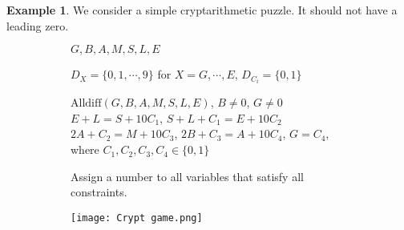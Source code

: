 \documentclass{article}
\theoremstyle{definition}
\newtheorem{example}{Example}[definition]
\begin{document}
\begin{example}
	\label{Cryptarithmetic puzzle}
	We consider a simple cryptarithmetic puzzle. It should not have a leading zero.
	\begin{figure}[h]
		\begin{subfigure}[h]{0.69\textwidth}
			\begin{description}[style=nextline]
				\item[Variables:] $G,B,A,M,S,L,E$
				\item[Domain:] $D_{X}=\{0,1,\cdots,9\}$ for $X=G,\cdots,E$, $D_{C_{i}}=\{0,1\}$
				\item[Constraint:] $\text{Alldiff}(G,B,A,M,S,L,E)$, $B\neq 0$, $G\neq 0$\\
				$E+L=S+10C_{1}$, $S+L+C_{1}=E+10C_{2}$\\
				$2A+C_{2}=M+10C_{3}$, $2B+C_{3}=A+10C_{4}$, $G=C_{4}$,\\
				where $C_{1},C_{2},C_{3},C_{4}\in\{0,1\}$
				\item[Goal:] Assign a number to all variables that satisfy all constraints.
			\end{description}
		\end{subfigure}
		\begin{subfigure}[h]{0.3\textwidth}
			\texttt{[image: Crypt game.png]}
		\end{subfigure}
	\end{figure}
\end{example}
\end{document}

